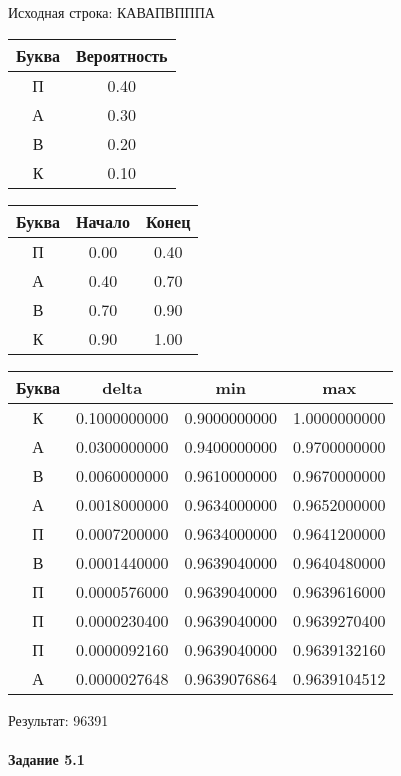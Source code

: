 \documentclass[a4paper, 12pt]{article}
\begin{document}
Исходная строка: КАВАПВПППА\
\begin{center}
 \begin{tabular}{ |c|c| } 
  \hline
     Буква & Вероятность \\ \hline
П & 0.40\\\hline
А & 0.30\\\hline
В & 0.20\\\hline
К & 0.10
\\ \hline \end{tabular}
\end{center}
\begin{center}
 \begin{tabular}{ |c|c|c| } 
  \hline
     Буква & Начало & Конец \\ \hline
П & 0.00 & 0.40\\\hline
А & 0.40 & 0.70\\\hline
В & 0.70 & 0.90\\\hline
К & 0.90 & 1.00
\\ \hline \end{tabular}
\end{center}
\begin{center}
 \begin{tabular}{ |c|c|c|c| } 
  \hline
     Буква & delta & min & max \\ \hline
К & 0.1000000000 & 0.9000000000 & 1.0000000000\\\hline
А & 0.0300000000 & 0.9400000000 & 0.9700000000\\\hline
В & 0.0060000000 & 0.9610000000 & 0.9670000000\\\hline
А & 0.0018000000 & 0.9634000000 & 0.9652000000\\\hline
П & 0.0007200000 & 0.9634000000 & 0.9641200000\\\hline
В & 0.0001440000 & 0.9639040000 & 0.9640480000\\\hline
П & 0.0000576000 & 0.9639040000 & 0.9639616000\\\hline
П & 0.0000230400 & 0.9639040000 & 0.9639270400\\\hline
П & 0.0000092160 & 0.9639040000 & 0.9639132160\\\hline
А & 0.0000027648 & 0.9639076864 & 0.9639104512
\\ \hline \end{tabular}
\end{center}
Результат: 96391
\pagebreak
\paragraph{Задание 5.1 \\
}
\end{document}

